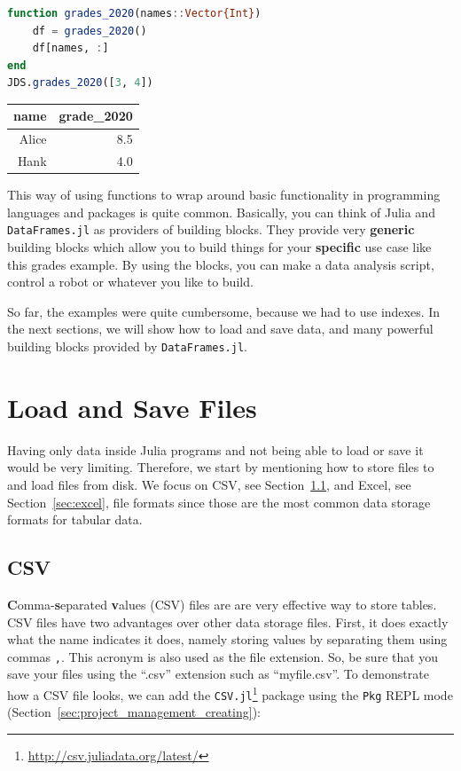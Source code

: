 \documentclass[
  notoc %
]{tufte-book}
\DeclareRobustCommand{\href}[2]{#2\footnote{\url{#1}}}
\newcommand{\passthrough}[1]{#1}
\begin{document}
\begin{lstlisting}[language=Julia]
function grades_2020(names::Vector{Int})
    df = grades_2020()
    df[names, :]
end
JDS.grades_2020([3, 4])
\end{lstlisting}

\begin{longtable}[]{@{}rr@{}}
\toprule()
name & grade\_2020 \\
\midrule()
\endhead
Alice & 8.5 \\
Hank & 4.0 \\
\bottomrule()
\end{longtable}

This way of using functions to wrap around basic functionality in
programming languages and packages is quite common. Basically, you can
think of Julia and \passthrough{\lstinline!DataFrames.jl!} as providers
of building blocks. They provide very \textbf{generic} building blocks
which allow you to build things for your \textbf{specific} use case like
this grades example. By using the blocks, you can make a data analysis
script, control a robot or whatever you like to build.

So far, the examples were quite cumbersome, because we had to use
indexes. In the next sections, we will show how to load and save data,
and many powerful building blocks provided by
\passthrough{\lstinline!DataFrames.jl!}.

\hypertarget{sec:load_save}{%
\section{Load and Save Files}\label{sec:load_save}}

Having only data inside Julia programs and not being able to load or
save it would be very limiting. Therefore, we start by mentioning how to
store files to and load files from disk. We focus on CSV, see
Section~\ref{sec:csv}, and Excel, see Section~\ref{sec:excel}, file
formats since those are the most common data storage formats for tabular
data.

\hypertarget{sec:csv}{%
\subsection{CSV}\label{sec:csv}}

\textbf{C}omma-\textbf{s}eparated \textbf{v}alues (CSV) files are are
very effective way to store tables. CSV files have two advantages over
other data storage files. First, it does exactly what the name indicates
it does, namely storing values by separating them using commas
\passthrough{\lstinline!,!}. This acronym is also used as the file
extension. So, be sure that you save your files using the ``.csv''
extension such as ``myfile.csv''. To demonstrate how a CSV file looks,
we can add the
\href{http://csv.juliadata.org/latest/}{\passthrough{\lstinline!CSV.jl!}}
package using the \passthrough{\lstinline!Pkg!} REPL mode
(Section~\ref{sec:project_management_creating}):
\end{document}
